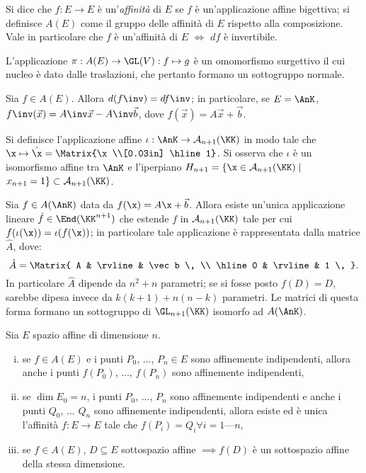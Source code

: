 \documentclass[10pt,landscape]{article}
\begin{document}
\begin{multicols}{3}
        Si dice che $f : E \rightarrow E$ è un'\textit{affinità} di $E$ se $f$ è un'applicazione affine bigettiva; si definisce $A(E)$ come il gruppo
        delle affinità di $E$ rispetto alla composizione. Vale
        in particolare che $f$ è un'affinità di $E$ $\iff$ $df$ è invertibile.

        L'applicazione $\pi : A(E)\rightarrow \GL(V) : f  \mapsto g$ è un omomorfismo surgettivo il cui nucleo è dato dalle traslazioni, che pertanto formano un sottogruppo normale.

        Sia $f \in A(E)$. Allora $d(f\inv) = df\inv$; in particolare, se $E = \AnK$, $f\inv(\vec x) = A\inv \vec x - A\inv \vec b$, dove $f(\vec x) = A \vec x + \vec b$.

        Si definisce l'applicazione affine $\iota : \AnK \to 
        \mathcal{A}_{n+1}(\KK)$ in modo tale che $\x \mapsto \hat{\x}=\Matrix{\x \\[0.03in] \hline 1}$. Si osserva che $\iota$
        è un isomorfismo affine tra $\AnK$ e l'iperpiano $H_{n+1}=\{\x\in \mathcal{A}_{n+1}(\KK)\mid$ $ x_{n+1}=1\}\subset \mathcal{A}_{n+1}(\KK)$.

        Sia $f \in A(\AnK)$ data da $f(\x)=A\x+\Vec{b}$.
        Allora esiste un'unica applicazione lineare $\hat f \in \End(\KK^{n+1})$ che estende $f$ in $\mathcal{A}_{n+1}(\KK)$ tale per cui
        $f(\iota(\x)) = \iota(f(\x))$; in particolare tale
        applicazione è rappresentata dalla matrice $\hat A$, dove:
        \[ \hat{A}=\Matrix{ A & \rvline & \vec b \, \\ \hline 0 & \rvline & 1 \, }. \]
        In particolare $\hat A$ dipende da $n^2 + n$ parametri; se si fosse posto $f(D) = D$, sarebbe dipesa invece da $k(k+1) + n(n-k)$ parametri. Le matrici di questa forma formano un sottogruppo di $\GL_{n+1}(\KK)$ isomorfo ad $A(\AnK)$.

        Sia $E$ spazio affine di dimensione $n$.
        
        \begin{enumerate}[(i)]
            \item se $f\in A(E)$ e i punti $P_0$, ..., $P_n \in E$ sono affinemente indipendenti, allora anche i punti $f(P_0)$, ..., $f(P_n)$ sono affinemente indipendenti,
            \item se $\dim E_0 = n$, i punti $P_0$, ..., $P_n$ sono affinemente indipendenti e anche i punti $Q_0$, ... $Q_n$ sono affinemente indipendenti, allora esiste ed è unica l'affinità $f : E \rightarrow E$ tale che $f(P_i)=Q_i \forall i=1\text{---}n$,
            \item se $f\in A(E)$, $D \subseteq E$ sottospazio affine $\implies f(D)$ è un sottospazio affine della stessa dimensione.
        \end{enumerate}
        

\end{multicols}
\end{document}

